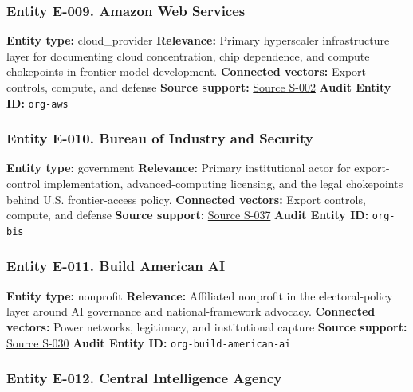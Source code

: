 \documentclass[
  american,
  11pt,
  letterpaper,
]{article}
\begin{document}
\subsubsection{Entity E-009. Amazon Web
Services}\label{entity-e-009-amazon-web-services}

\textbf{Entity type:} cloud\_provider \textbf{Relevance:} Primary
hyperscaler infrastructure layer for documenting cloud concentration,
chip dependence, and compute chokepoints in frontier model development.
\textbf{Connected vectors:} Export controls, compute, and defense
\textbf{Source support:}
\hyperref[source-s-002-amazon-and-anthropic-announce-strategic-collaboration-to-advance-generative-ai]{Source
S-002} \textbf{Audit Entity ID:} \texttt{org-aws}

\subsubsection{Entity E-010. Bureau of Industry and
Security}\label{entity-e-010-bureau-of-industry-and-security}

\textbf{Entity type:} government \textbf{Relevance:} Primary
institutional actor for export-control implementation,
advanced-computing licensing, and the legal chokepoints behind U.S.
frontier-access policy. \textbf{Connected vectors:} Export controls,
compute, and defense \textbf{Source support:}
\hyperref[source-s-037-guidance-regarding-enforcement-of-license-requirements-for-advanced-computing-items-for-entities-headquartered-in-country-group-d-5-and-macau]{Source
S-037} \textbf{Audit Entity ID:} \texttt{org-bis}

\subsubsection{Entity E-011. Build American
AI}\label{entity-e-011-build-american-ai}

\textbf{Entity type:} nonprofit \textbf{Relevance:} Affiliated nonprofit
in the electoral-policy layer around AI governance and
national-framework advocacy. \textbf{Connected vectors:} Power networks,
legitimacy, and institutional capture \textbf{Source support:}
\hyperref[source-s-030-openai-linked-pac-doubles-down-in-kentucky]{Source
S-030} \textbf{Audit Entity ID:} \texttt{org-build-american-ai}

\subsubsection{Entity E-012. Central Intelligence
Agency}\label{entity-e-012-central-intelligence-agency}
\end{document}

